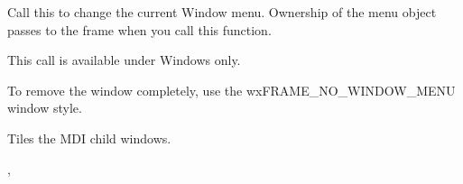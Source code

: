 \label{wxmdiparentframesetwindowmenu}


Call this to change the current Window menu. Ownership of the menu object passes to
the frame when you call this function.

This call is available under Windows only.

To remove the window completely, use the wxFRAME\_NO\_WINDOW\_MENU window style.

\label{wxmdiparentframetile}


Tiles the MDI child windows.


,\rtfsp
{}


